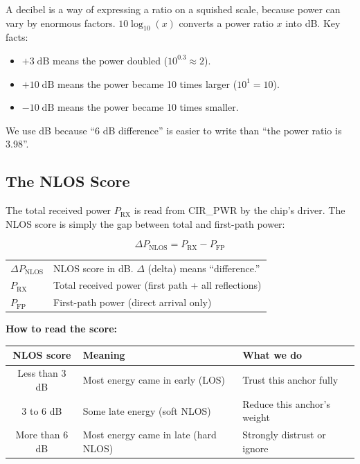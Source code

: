 \documentclass[11pt,a4paper]{article}
\begin{document}
\begin{plain}
A decibel is a way of expressing a ratio on a squished scale, because power can vary by enormous factors. $10\log_{10}(x)$ converts a power ratio $x$ into dB. Key facts:
\begin{itemize}[leftmargin=2em,topsep=2pt]
  \item $+3\;\text{dB}$ means the power doubled ($10^{0.3} \approx 2$).
  \item $+10\;\text{dB}$ means the power became 10 times larger ($10^1 = 10$).
  \item $-10\;\text{dB}$ means the power became 10 times smaller.
\end{itemize}
We use dB because ``6 dB difference'' is easier to write than ``the power ratio is 3.98''.
\end{plain}

\subsection{The NLOS Score}

The total received power $P_{\text{RX}}$ is read from CIR\_PWR by the chip's driver. The NLOS score is simply the gap between total and first-path power:

\begin{equation}
\boxed{
\Delta P_{\text{NLOS}} = P_{\text{RX}} - P_{\text{FP}}
}
\label{eq:nlos}
\end{equation}

\begin{symbols}
\begin{tabular}{ll}
$\Delta P_{\text{NLOS}}$ & NLOS score in dB. $\Delta$ (delta) means ``difference.'' \\
$P_{\text{RX}}$ & Total received power (first path + all reflections) \\
$P_{\text{FP}}$ & First-path power (direct arrival only) \\
\end{tabular}
\end{symbols}

\bigskip
\textbf{How to read the score:}
\begin{center}
\begin{tabular}{cll}
\toprule
\textbf{NLOS score} & \textbf{Meaning} & \textbf{What we do} \\
\midrule
Less than 3 dB & Most energy came in early (LOS) & Trust this anchor fully \\
3 to 6 dB & Some late energy (soft NLOS) & Reduce this anchor's weight \\
More than 6 dB & Most energy came in late (hard NLOS) & Strongly distrust or ignore \\
\bottomrule
\end{tabular}
\end{center}
\end{document}
